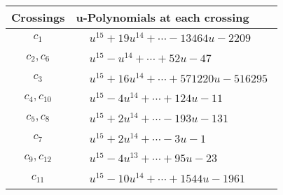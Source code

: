 \documentclass[1p]{elsarticle_modified}
\theoremstyle{definition}
\begin{document}
\begin{tabular}{m{50pt}|m{274pt}}
Crossings & \hspace{64pt}u-Polynomials at each crossing \\
\hline $$\begin{aligned}c_{1}\end{aligned}$$&$\begin{aligned}
&u^{15}+19 u^{14}+\cdots-13464 u-2209
\end{aligned}$\\
\hline $$\begin{aligned}c_{2},c_{6}\end{aligned}$$&$\begin{aligned}
&u^{15}- u^{14}+\cdots+52 u-47
\end{aligned}$\\
\hline $$\begin{aligned}c_{3}\end{aligned}$$&$\begin{aligned}
&u^{15}+16 u^{14}+\cdots+571220 u-516295
\end{aligned}$\\
\hline $$\begin{aligned}c_{4},c_{10}\end{aligned}$$&$\begin{aligned}
&u^{15}-4 u^{14}+\cdots+124 u-11
\end{aligned}$\\
\hline $$\begin{aligned}c_{5},c_{8}\end{aligned}$$&$\begin{aligned}
&u^{15}+2 u^{14}+\cdots-193 u-131
\end{aligned}$\\
\hline $$\begin{aligned}c_{7}\end{aligned}$$&$\begin{aligned}
&u^{15}+2 u^{14}+\cdots-3 u-1
\end{aligned}$\\
\hline $$\begin{aligned}c_{9},c_{12}\end{aligned}$$&$\begin{aligned}
&u^{15}-4 u^{13}+\cdots+95 u-23
\end{aligned}$\\
\hline $$\begin{aligned}c_{11}\end{aligned}$$&$\begin{aligned}
&u^{15}-10 u^{14}+\cdots+1544 u-1961
\end{aligned}$\\
\hline
\end{tabular}\\~\\
\end{document}
